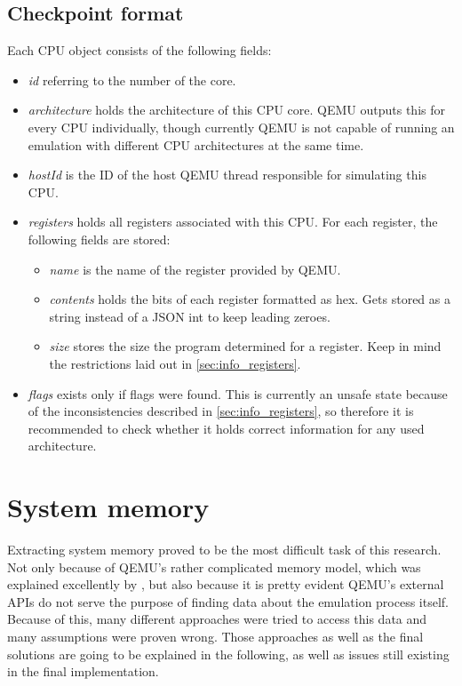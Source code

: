 \subsection{Checkpoint format}
Each CPU object consists of the following fields:
\begin{itemize}
    \item \emph{id} referring to the number of the core.
    \item \emph{architecture} holds the architecture of this CPU core.
    QEMU outputs this for every CPU individually,
    though currently QEMU is not capable of running an emulation with different CPU architectures at the same time.
    \item \emph{hostId} is the ID of the host QEMU thread responsible for simulating this CPU.
    \item \emph{registers} holds all registers associated with this CPU.
    For each register, the following fields are stored:
    \begin{itemize}
        \item \emph{name} is the name of the register provided by QEMU.
        \item \emph{contents} holds the bits of each register formatted as hex.
        Gets stored as a string instead of a JSON int to keep leading zeroes.
        \item \emph{size} stores the size the program determined for a register.
        Keep in mind the restrictions laid out in \autoref{sec:info_registers}.
    \end{itemize}
    \item \emph{flags} exists only if flags were found.
    This is currently an unsafe state because of the inconsistencies described in \autoref{sec:info_registers},
    so therefore it is recommended to check whether it holds correct information for any used architecture.
\end{itemize}

\section{System memory}\label{sec:memory_extraction}
Extracting system memory proved to be the most difficult task of this research.
Not only because of QEMU's rather complicated memory model,
which was explained excellently by \cite{kitcheckpoints},
but also because it is pretty evident QEMU's external APIs do not serve the purpose of finding data about the emulation process itself.
Because of this, many different approaches were tried to access this data
and many assumptions were proven wrong.
Those approaches as well as the final solutions are going to be explained in the following,
as well as issues still existing in the final implementation.

